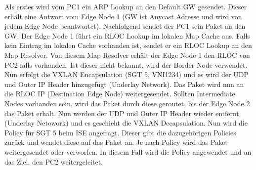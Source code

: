 Als erstes wird vom PC1 ein ARP Lookup an den Default GW gesendet. Dieser erhält eine Antwort vom Edge Node 1 (GW ist Anycast Adresse und wird von jedem Edge Node beantwortet). Nachfolgend sendet der PC1 sein Paket an den GW. Der Edge Node 1 führt ein RLOC Lookup im lokalen Map Cache aus. Falls kein Eintrag im lokalen Cache vorhanden ist, sendet er ein RLOC Lookup an den Map Resolver. Von diesem Map Resolver erhält der Edge Node 1 den RLOC von PC2 falls vorhanden. Ist dieser nicht bekannt, wird der Border Node verwendet. Nun erfolgt die VXLAN Encapsulation (SGT 5, VNI1234) und es wird der UDP und Outer IP Header hinzugefügt (Underlay Network). Das Paket wird nun an die RLOC IP (Destination Edge Node) weitergesendet. Sollten Intermediate Nodes vorhanden sein, wird das Paket durch diese geroutet, bis der Edge Node 2 das Paket erhält. Nun werden der UDP und Outer IP Header wieder entfernt (Underlay Netowork) und es geschieht die VXLAN Decapsulation. Nun wird die Policy für SGT 5 beim ISE angefragt. Dieser gibt die dazugehörigen Policies zurück und wendet diese auf das Paket an. Je nach Policy wird das Paket weitergesendet oder verworfen. In diesem Fall wird die Policy angewendet und an das Ziel, den PC2 weitergeleitet.



